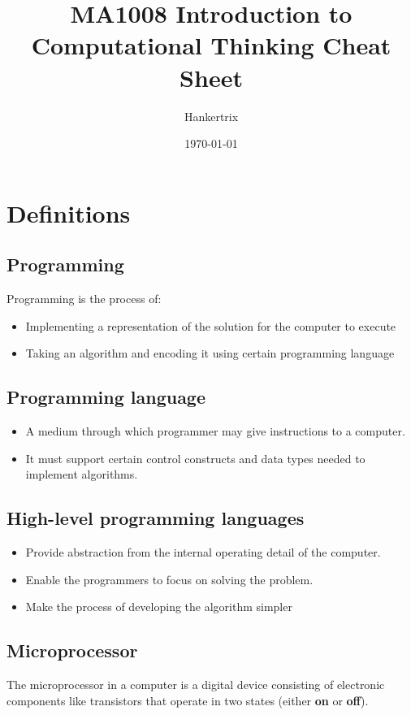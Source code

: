\documentclass[11pt]{article}
\author{Hankertrix}
\date{\today}
\title{MA1008 Introduction to Computational Thinking Cheat Sheet}
\begin{document}
\maketitle
\setcounter{tocdepth}{2}
\tableofcontents \clearpage
\section{Definitions}
\label{sec:org247fdfe}

\subsection{Programming}
\label{sec:org7c09845}
Programming is the process of:
\begin{itemize}
\item Implementing a representation of the solution for the computer to execute
\item Taking an algorithm and encoding it using certain programming language
\end{itemize}

\subsection{Programming language}
\label{sec:orgf8fc971}
\begin{itemize}
\item A medium through which programmer may give instructions to a computer.
\item It must support certain control constructs and data types needed to implement algorithms.
\end{itemize}

\subsection{High-level programming languages}
\label{sec:orgdd1543e}
\begin{itemize}
\item Provide abstraction from the internal operating detail of the computer.
\item Enable the programmers to focus on solving the problem.
\item Make the process of developing the algorithm simpler
\end{itemize}

\subsection{Microprocessor}
\label{sec:org7cd13e1}
The microprocessor in a computer is a digital device consisting of electronic components like transistors that operate in two states (either \textbf{on} or \textbf{off}).
\end{document}
